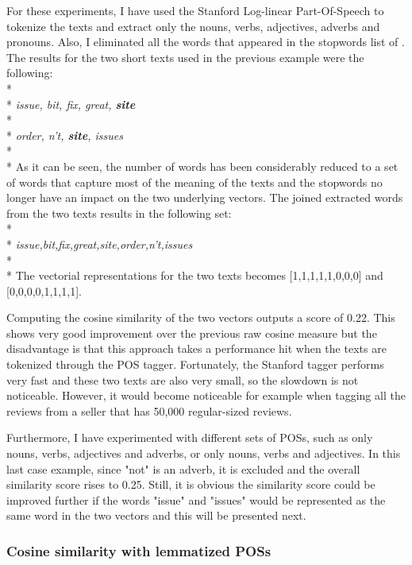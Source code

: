 For these experiments, I have used the Stanford Log-linear Part-Of-Speech \citet{StanfordNLPTagger} to tokenize the texts and extract only the nouns, verbs, adjectives, adverbs and pronouns. Also, I eliminated all the words that appeared in the stopwords list of \citet{SaltonandBuckleyStopWordsAggresive}. 
The results for the two short texts used in the previous example were the following:
\\*
\\*
\textit{issue, bit, fix, great, \textbf{site}}
\\*
\\*
\textit{order, n’t, \textbf{site}, issues}
\\*
\\*
As it can be seen, the number of words has been considerably reduced to a set of words that capture most of the meaning of the texts and the stopwords no longer have an impact on the two underlying vectors.
The joined extracted words from the two texts results in the following set:
\\*
\\*
\textit{issue,bit,fix,great,site,order,n't,issues}
\\*
\\*
The vectorial representations for the two texts becomes [1,1,1,1,1,0,0,0] and [0,0,0,0,1,1,1,1]. 

Computing the cosine similarity of the two vectors outputs a score of 0.22. This shows very good improvement over the previous raw cosine measure but the disadvantage is that this approach takes a performance hit when the texts are tokenized through the POS tagger. Fortunately, the Stanford tagger performs very fast and these two texts are also very small, so the slowdown is not noticeable. However, it would become noticeable for example when tagging all the reviews from a seller that has 50,000 regular-sized reviews.

Furthermore, I have experimented with different sets of POSs, such as only nouns, verbs, adjectives and adverbs, or only nouns, verbs and adjectives. In this last case example, since "not" is an adverb, it is excluded and the overall similarity score rises to 0.25.
Still, it is obvious the similarity score could be improved further if the words "issue" and "issues" would be represented as the same word in the two vectors and this will be presented next. 

\subsubsection{Cosine similarity with lemmatized POSs}

